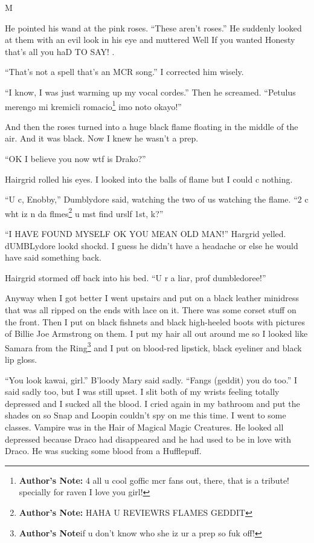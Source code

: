 M\documentclass{article}
\begin{document}
He pointed his wand at the pink roses. “These aren’t roses.” He suddenly looked at them with an evil look in his eye and muttered Well If you wanted Honesty that’s all you haD TO SAY! .

“That’s not a spell that’s an MCR song.” I corrected him wisely.

“I know, I was just warming up my vocal cordes.” Then he screamed. “Petulus merengo mi kremicli romacio\footnote{\textbf{Author's Note: }4 all u cool goffic mcr fans out, there, that is a tribute! specially for raven I love you girl!} imo noto okayo!”

And then the roses turned into a huge black flame floating in the middle of the air. And it was black. Now I knew he wasn’t a prep.

“OK I believe you now wtf is Drako?”

Hairgrid rolled his eyes. I looked into the balls of flame but I could c nothing.

“U c, Enobby,” Dumblydore said, watching the two of us watching the flame. “2 c wht iz n da flmes\footnote{\textbf{Author's Note: }HAHA U REVIEWRS FLAMES GEDDIT} u mst find urslf 1st, k?”

“I HAVE FOUND MYSELF OK YOU MEAN OLD MAN!” Hargrid yelled. dUMBLydore lookd shockd. I guess he didn’t have a headache or else he would have said something back.

Hairgrid stormed off back into his bed. “U r a liar, prof dumbledoree!”

Anyway when I got better I went upstairs and put on a black leather minidress that was all ripped on the ends with lace on it. There was some corset stuff on the front. Then I put on black fishnets and black high-heeled boots with pictures of Billie Joe Armstrong on them. I put my hair all out around me so I looked like Samara from the Ring\footnote{\textbf{Author's Note}if u don’t know who she iz ur a prep so fuk off!} and I put on blood-red lipstick, black eyeliner and black lip gloss.

“You look kawai, girl.” B’loody Mary said sadly. “Fangs (geddit) you do too.” I said sadly too, but I was still upset. I slit both of my wrists feeling totally depressed and I sucked all the blood. I cried again in my bathroom and put the shades on so Snap and Loopin couldn’t spy on me this time. I went to some classes. Vampire was in the Hair of Magical Magic Creatures. He looked all depressed because Draco had disappeared and he had used to be in love with Draco. He was sucking some blood from a Hufflepuff.
\end{document}
